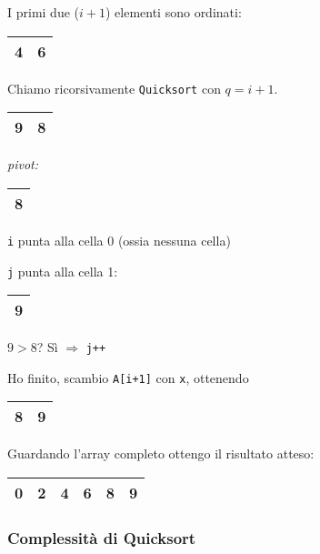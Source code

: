 I primi due ($i+1$) elementi sono ordinati: 
\begin{center}
	\begin{tabular}{|l|l|}
		\hline
		4 & 6 \\
		\hline
	\end{tabular}
\end{center}

Chiamo ricorsivamente \texttt{Quicksort} con $q = i + 1$.

\begin{center}
	\begin{tabular}{|l|l|}
		\hline
		9 & 8 \\
		\hline
	\end{tabular}
	\hspace{1cm}
	\emph{pivot: }
	\begin{tabular}{|l|}
		\hline
		8 \\
		\hline
	\end{tabular}
\end{center}

\texttt{i} punta alla cella 0 (ossia nessuna cella) \par
\texttt{j} punta alla cella 1:
\begin{tabular}{|l|}
	\hline
	9 \\
	\hline
\end{tabular}

$9 > 8$? Sì $\Rightarrow$ \texttt{j++} \par
Ho finito, scambio \texttt{A[i+1]} con \texttt{x}, ottenendo \par
\begin{center}
	\begin{tabular}{|l|l|}
		\hline
		8 & 9 \\
		\hline
	\end{tabular}
\end{center}

Guardando l'array completo ottengo il risultato atteso:
\begin{center}
	\begin{tabular}{|l|l|l|l|l|l|}
		\hline
		0 & 2 & 4 & 6 & 8 & 9 \\
		\hline
	\end{tabular}
\end{center}

\subsubsection{Complessità di Quicksort}

